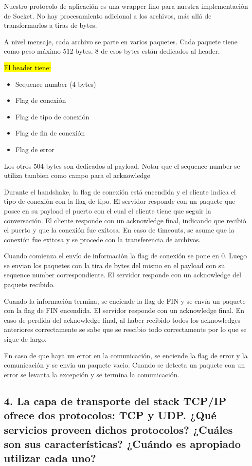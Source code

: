 \documentclass{article}
\begin{document}
Nuestro protocolo de aplicación es una wrapper fino para nuestra implementación de Socket. No hay procesamiento adicional a los archivos, más allá de transformarlos a tiras de bytes.

A nivel mensaje, cada archivo se parte en varios paquetes. Cada paquete tiene como peso máximo 512 bytes. 8 de esos bytes están dedicados al header.

\hl{El header tiene:}

\begin{itemize}
\item
  Sequence number (4 bytes)
\item
  Flag de conexión
\item
  Flag de tipo de conexión
\item
  Flag de fin de conexión
\item
  Flag de error
\end{itemize}

Los otros 504 bytes son dedicados al payload. Notar que el sequence number se utiliza tambien como campo para el acknowledge

Durante el handshake, la flag de conexión está encendida y el cliente indica el tipo de conexión con la flag de tipo. El servidor responde con un paquete que posee en su payload el puerto con el cual el cliente tiene que seguir la conversación. El cliente responde con un acknowledge final, indicando que recibió el puerto y que la conexión fue exitosa. En caso de timeouts, se asume que la conexión fue exitosa y se procede con la transferencia de archivos.

Cuando comienza el envío de información la flag de conexión se pone en 0. Luego se envian los paquetes con la tira de bytes del mismo en el payload con su sequence number correspondiente. El servidor responde con un acknowledge del paquete recibido. 

Cuando la información termina, se enciende la flag de FIN y se envía un paquete con la flag de FIN encendida. El servidor responde con un acknowledge final. En caso de perdida del acknowledge final, al haber recibido todos los acknowledges anteriores correctamente se sabe que se reecibio todo correctamente por lo que se sigue de largo. 

En caso de que haya un error en la comunicación, se enciende la flag de error y la comunicación y se envia un paquete vacio. Cuando se detecta un paquete con un error se levanta la excepción y se termina la comunicación.

\subsection{\texorpdfstring{\textbf{4. La capa de transporte del stack TCP/IP ofrece dos protocolos: TCP y UDP. ¿Qué servicios proveen dichos protocolos? ¿Cuáles son sus características? ¿Cuándo es apropiado utilizar cada uno?}}{4. La capa de transporte del stack TCP/IP ofrece dos protocolos: TCP y UDP. ¿Qué servicios proveen dichos protocolos? ¿Cuáles son sus características? ¿Cuándo es apropiado utilizar cada uno?}}\label{la-capa-de-transporte-del-stack-tcpip-ofrece-dos-protocolos-tcp-y-udp.-quuxe9-servicios-proveen-dichos-protocolos-cuuxe1les-son-sus-caracteruxedsticas-cuuxe1ndo-es-apropiado-utilizar-cada-uno}
\end{document}
